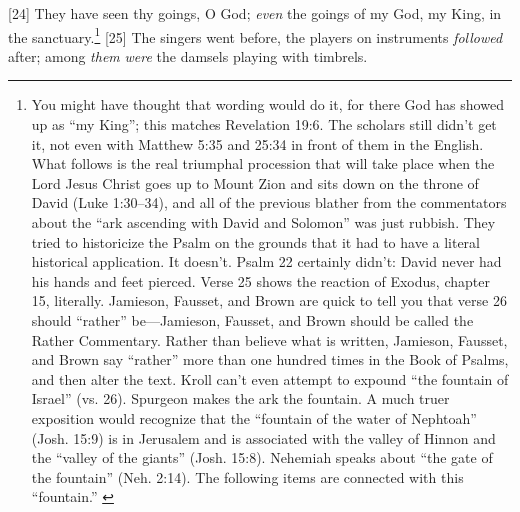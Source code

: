 [24] \textcolor[rgb]{0.00,0.00,1.00}{They have seen thy goings, O God; \emph{even} the goings of my God, my King, in the sanctuary.}\footnote{You might have thought that wording would do it, for there God has showed up as “my King”; this matches Revelation 19:6. The scholars still didn’t get it, not even with Matthew 5:35 and 25:34 in front of them in the English. What follows is the real triumphal procession that will take place when the Lord Jesus Christ goes up to Mount Zion and sits down on the throne of David (Luke 1:30--34), and all of the previous blather from the commentators about the “ark ascending with David and Solomon” was just rubbish. They tried to historicize the Psalm on the grounds that it had to have a literal historical application. It doesn’t. Psalm 22 certainly didn’t: David never had his hands and feet pierced. Verse 25 shows the reaction of Exodus, chapter 15, literally. Jamieson, Fausset, and Brown are quick to tell you that verse 26 should “rather” be—Jamieson, Fausset, and Brown should be called the Rather Commentary. Rather than believe what is written, Jamieson, Fausset, and Brown say “rather” more than one hundred times in the Book of Psalms, and then alter the text. Kroll can’t even attempt to expound “the fountain of Israel” (vs. 26). Spurgeon makes the ark the fountain. A much truer exposition would recognize that the “fountain of the water of Nephtoah” (Josh. 15:9) is in Jerusalem and is associated with the valley of Hinnon and the “valley of the giants” (Josh. 15:8). Nehemiah speaks about “the gate of the fountain” (Neh. 2:14). The following items are connected with this “fountain.”  \cite{Ruckman1992Psalms}  }
[25] \textcolor[rgb]{0.00,0.00,1.00}{The singers went before, the players on instruments \emph{followed} after; among \emph{them} \emph{were} the damsels playing with timbrels.}
